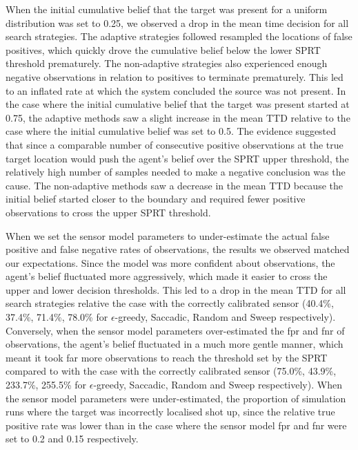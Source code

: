 When the initial cumulative belief that the target was present for a uniform distribution was set to 0.25, we observed a drop in the mean time decision for all search strategies. The adaptive strategies followed resampled the locations of false positives, which quickly drove the cumulative belief below the lower SPRT threshold prematurely. The non-adaptive strategies also experienced enough negative observations in relation to positives to terminate prematurely. This led to an inflated rate at which the system concluded the source was not present. In the case where the initial cumulative belief that the target was present started at 0.75, the adaptive methods saw a slight increase in the mean TTD relative to the case where the initial cumulative belief was set to 0.5. The evidence suggested that since a comparable number of consecutive positive observations at the true target location would push the agent's belief over the SPRT upper threshold, the relatively high number of samples needed to make a negative conclusion was the cause. The non-adaptive methods saw a decrease in the mean TTD because the initial belief started closer to the boundary and required  fewer positive observations to cross the upper SPRT threshold.\par


When we set the sensor model parameters to under-estimate the actual false positive and false negative rates of observations, the results we observed matched our expectations. Since the model was more confident about observations, the agent's belief fluctuated more aggressively, which made it easier to cross the upper and lower decision thresholds. This led to a drop in the mean TTD for all search strategies relative the case with the correctly calibrated sensor (40.4\%, 37.4\%, 71.4\%, 78.0\% for $\epsilon$-greedy, Saccadic, Random and Sweep respectively). Conversely, when the sensor model parameters over-estimated the fpr and fnr of observations, the agent's belief fluctuated in a much more gentle manner, which meant it took far more observations to reach the threshold set by the SPRT compared to with the case with the correctly calibrated sensor (75.0\%, 43.9\%, 233.7\%, 255.5\% for $\epsilon$-greedy, Saccadic, Random and Sweep respectively). When the sensor model parameters were under-estimated, the proportion of simulation runs where the target was incorrectly localised shot up, since the relative true positive rate was lower than in the case where the sensor model fpr and fnr were set to 0.2 and 0.15 respectively.\par

